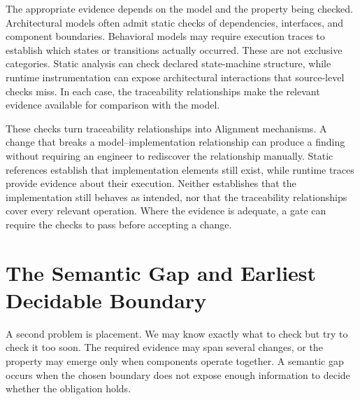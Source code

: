 The appropriate evidence depends on the model and the property being checked. Architectural models often admit static checks of dependencies, interfaces, and component boundaries. Behavioral models may require execution traces to establish which states or transitions actually occurred. These are not exclusive categories. Static analysis can check declared state-machine structure, while runtime instrumentation can expose architectural interactions that source-level checks miss. In each case, the traceability relationships make the relevant evidence available for comparison with the model.


These checks turn traceability relationships into Alignment mechanisms. A change that breaks a model–implementation relationship can produce a finding without requiring an engineer to rediscover the relationship manually. Static references establish that implementation elements still exist, while runtime traces provide evidence about their execution. Neither establishes that the implementation still behaves as intended, nor that the traceability relationships cover every relevant operation. Where the evidence is adequate, a gate can require the checks to pass before accepting a change.

\section{The Semantic Gap and Earliest Decidable Boundary}\label{heading:the-semantic-gap}



A second problem is placement. We may know exactly what to check but try to check it too soon. The required evidence may span several changes, or the property may emerge only when components operate together. A semantic gap occurs when the chosen boundary does not expose enough information to decide whether the obligation holds.

